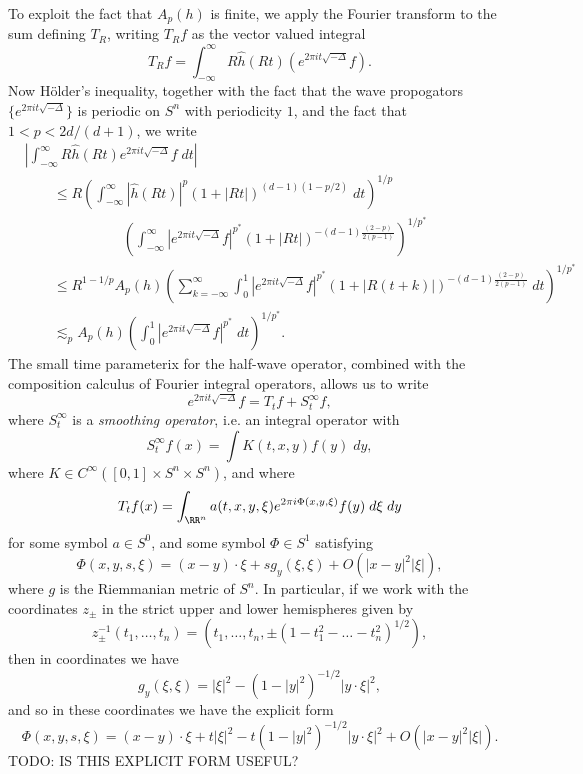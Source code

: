 To exploit the fact that $A_p(h)$ is finite, we apply the Fourier transform to the sum defining $T_R$, writing $T_R f$ as the vector valued integral
%
\[ T_R f = \int_{-\infty}^\infty R \widehat{h}(R t) (e^{2  \pi i t \sqrt{-\Delta}} f). \]
%
Now H\"{o}lder's inequality, together with the fact that the wave propogators $\{ e^{2 \pi i t \sqrt{-\Delta}} \}$ is periodic on $S^n$ with periodicity $1$, and the fact that $1 < p < 2d/(d+1)$, we write
%
\begin{align*}
    & \left| \int_{-\infty}^\infty R \widehat{h}(Rt) e^{2 \pi i t \sqrt{-\Delta}} f\; dt \right|\\
    &\quad\quad\leq R \left( \int_{-\infty}^\infty |\widehat{h}(Rt)|^p (1 + |Rt|)^{(d-1)(1 - p/2)}\; dt \right)^{1/p}\\
    &\quad\quad\quad\quad\quad\quad\quad\left( \int_{-\infty}^\infty |e^{2 \pi i t \sqrt{-\Delta}} f|^{p^*} (1 + |Rt|)^{- (d-1)\frac{(2 - p)}{2(p-1)}} \right)^{1/p^*}\\
    &\quad\quad\leq R^{1 - 1/p} A_p(h) \left( \sum_{k = -\infty}^\infty \int_0^1 |e^{2 \pi i t \sqrt{-\Delta}} f|^{p^*} (1 + |R(t + k)|)^{- (d-1)\frac{(2 - p)}{2(p-1)}}\; dt \right)^{1/p^*}\\
    &\quad\quad\lesssim_p A_p(h) \left( \int_0^1 |e^{2 \pi i t \sqrt{-\Delta}} f|^{p^*}\; dt \right)^{1/p^*}.
\end{align*}
%
The small time parameterix for the half-wave operator, combined with the composition calculus of Fourier integral operators, allows us to write
%
\[ e^{2 \pi i t \sqrt{-\Delta}} f = T_t f + S^\infty_t f, \]
%
where $S^\infty_t$ is a \emph{smoothing operator}, i.e. an integral operator with
%
\[ S^\infty_t f(x) = \int K(t,x,y) f(y)\; dy, \]
%
where $K \in C^\infty([0,1] \times S^n \times S^n)$, and where
%
\[ T_t f(x) = \int_{\RR^n} a(t,x,y,\xi) e^{2 \pi i \Phi(x,y,\xi)} f(y)\; d\xi\; dy \]
%
for some symbol $a \in S^0$, and some symbol $\Phi \in S^1$ satisfying
%
\[ \Phi(x,y,s,\xi) = (x - y) \cdot \xi + s g_y(\xi,\xi) + O(|x - y|^2 |\xi|), \]
%
where $g$ is the Riemmanian metric of $S^n$. In particular, if we work with the coordinates $z_{\pm}$ in the strict upper and lower hemispheres given by
%
\[ z_{\pm}^{-1}(t_1,\dots,t_n) = (t_1,\dots,t_n, \pm (1-t_1^2 - \dots - t_n^2)^{1/2}), \]
%
then in coordinates we have
%
\[ g_y(\xi,\xi) = |\xi|^2 - (1 - |y|^2)^{-1/2} |y \cdot \xi|^2, \]
%
and so in these coordinates we have the explicit form
%
\[ \Phi(x,y,s,\xi) = (x - y) \cdot \xi + t |\xi|^2 - t (1 - |y|^2)^{-1/2} |y \cdot \xi|^2 + O(|x - y|^2 |\xi|). \]
%
TODO: IS THIS EXPLICIT FORM USEFUL?

